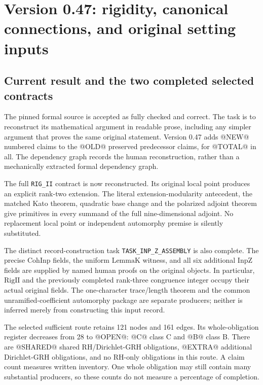 \section{Version 0.47: rigidity, canonical connections, and original setting inputs}
\label{sec:dependency-audit-v47}

\subsection{Current result and the two completed selected contracts}

The pinned formal source is accepted as fully checked and correct.
The task is to reconstruct its mathematical argument in readable prose,
including any simpler argument that proves the same original statement.
Version 0.47 adds @NEW@ numbered claims to the @OLD@ preserved predecessor
claims, for @TOTAL@ in all. The dependency graph records the human
reconstruction, rather than a mechanically extracted formal dependency
graph.

The full \texttt{RIG\_II} contract is now reconstructed. Its original
local point produces an explicit rank-two extension. The literal
extension-modularity antecedent, the matched Kato theorem, quadratic
base change and the polarized adjoint theorem give primitives in every
summand of the full nine-dimensional adjoint. No replacement local
point or independent automorphy premise is silently substituted.

The distinct record-construction task
\texttt{TASK\_INP\_Z\_ASSEMBLY} is also complete. The precise
\(\mathrm{CohInp}\) fields, the uniform \(\mathrm{LemmaK}\)
witness, and all six additional \(\mathrm{InpZ}\) fields are supplied
by named human proofs on the original objects. In particular,
\(\mathrm{RigII}\) and the previously completed rank-three
congruence integer occupy their actual original fields.
The one-character trace/length theorem and the common
unramified-coefficient automorphy package are separate producers;
neither is inferred merely from constructing this input record.

The selected sufficient route retains 121 nodes and 161 edges.
Its whole-obligation register decreases from 28 to @OPEN@:
@C@ class C and @B@ class B. There are @SHARED@ shared RH/Dirichlet-GRH
obligations, @EXTRA@ additional Dirichlet-GRH obligations, and no
RH-only obligations in this route. A claim count measures written
inventory. One whole obligation may still contain many substantial
producers, so these counts do not measure a percentage of completion.

